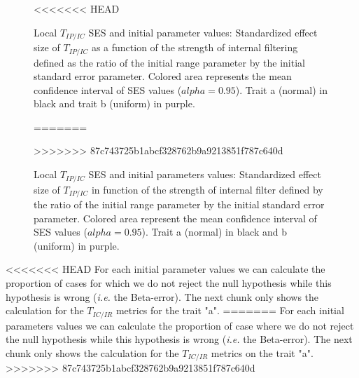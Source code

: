 \documentclass[12pt]{article}\usepackage[]{graphicx}\usepackage[]{color}
\newenvironment{knitrout}{}{} %
\begin{document}
\begin{landscape}
\begin{knitrout}
\begin{figure}
{}

<<<<<<< HEAD
\caption[Local $T_{IP/IC}$ SES and initial parameter values]{Local $T_{IP/IC}$ SES and initial parameter values: Standardized effect size of $T_{IP/IC}$ as a function of the strength of internal filtering defined as the ratio of the initial range parameter by the initial standard error parameter. Colored area represents the mean confidence interval of SES values ($alpha = 0.95$). Trait a (normal) in black and trait b (uniform) in purple.}\label{fig:In_filter_results_plot_initparam}
=======
\caption[Local $T_{IP/IC}$ SES and initial parameters values]{Local $T_{IP/IC}$ SES and initial parameters values: Standardized effect size of $T_{IP/IC}$ in function of the strength of internal filter defined by the ratio of the initial range parameter by the initial standard error parameter. Colored area represent the mean confidence interval of SES values ($alpha = 0.95$). Trait a (normal) in black and b (uniform) in purple.}\label{fig:In_filter_results_plot_initparam}
>>>>>>> 87c743725b1abcf328762b9a9213851f787c640d
\end{figure}


\end{knitrout}
 
  
<<<<<<< HEAD
For each initial parameter values we can calculate the proportion of cases for which we do not reject the null hypothesis while this hypothesis is wrong (\textit{i.e.} the Beta-error). The next chunk only shows the calculation for the $T_{IC/IR}$ metrics for the trait "a".
=======
For each initial parameters values we can calculate the proportion of case where we do not reject the null hypothesis while this hypothesis is wrong (\textit{i.e.} the Beta-error). The next chunk only shows the calculation for the $T_{IC/IR}$ metrics on the trait "a".
>>>>>>> 87c743725b1abcf328762b9a9213851f787c640d


\end{landscape}
\end{document}
